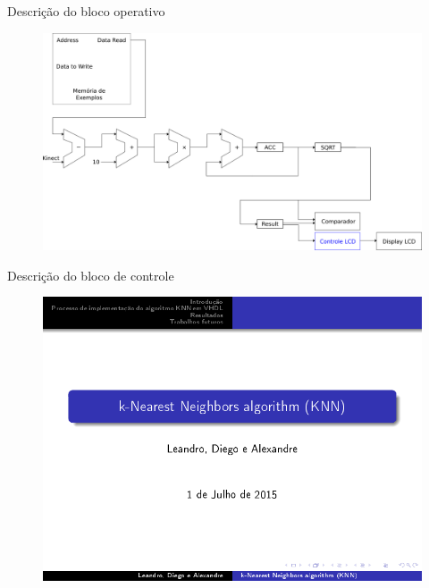 \documentclass[11pt]{beamer}
\begin{document}
\begin{frame}{Descrição do bloco operativo}
	\begin{figure}[ht]
	\centering
	\includegraphics[width=1.0\textwidth]{knn_sem_controle}
	\label{fig:knn_sem_controle}
	\end{figure}
\end{frame}

\begin{frame}{Descrição do bloco de controle}
	\begin{figure}[ht]
	\centering
	\includegraphics[width=1.0\textwidth]{knn}
	\label{fig:knncalc}
	\end{figure}
\end{frame}
\end{document}
